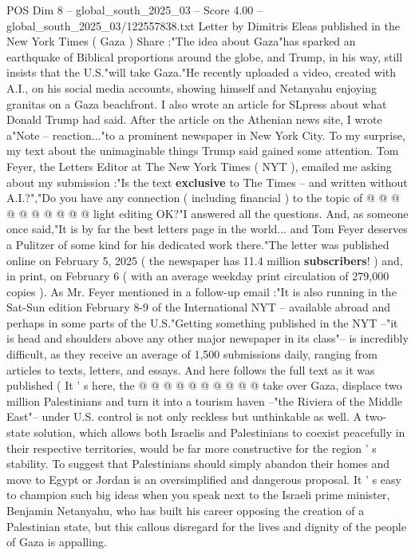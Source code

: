 \begin{textsample}{POS Dim 8 – global\_south\_2025\_03 – Score 4.00 – global\_south\_2025\_03/122557838.txt}  \label{ex:f8_pos_149}
Letter by Dimitris Eleas published in the New York Times ( Gaza ) Share :"The idea about Gaza"has sparked an earthquake of Biblical proportions around the globe, and Trump, in his way, still insists that the U.S."will take Gaza."He recently uploaded a video, created with A.I., on his social media accounts, showing himself and Netanyahu enjoying granitas on a Gaza beachfront.
I also wrote an article for SLpress about what Donald Trump had said.
After the article on the Athenian news site, I wrote a"Note -- reaction..."to a prominent newspaper in New York City.
To my surprise, my text about the unimaginable things Trump said gained some attention.
Tom Feyer, the Letters Editor at The New York Times ( NYT ), emailed me asking about my submission :"Is the text \textbf{exclusive} to The Times -- and written without A.I.?","Do you have any connection ( including financial ) to the topic of @ @ @ @ @ @ @ @ @ @ light editing OK?"I answered all the questions.
And, as someone once said,"It is by far the best letters page in the world... and Tom Feyer deserves a Pulitzer of some kind for his dedicated work there."The letter was published online on February 5, 2025 ( the newspaper has 11.4 million \textbf{subscribers}! ) and, in print, on February 6 ( with an average weekday print circulation of 279,000 copies ).
As Mr.
Feyer mentioned in a follow-up email :"It is also running in the Sat-Sun edition February 8-9 of the International NYT -- available abroad and perhaps in some parts of the U.S."Getting something published in the NYT --"it is head and shoulders above any other major newspaper in its class"-- is incredibly difficult, as they receive an average of 1,500 submissions daily, ranging from articles to texts, letters, and essays.
And here follows the full text as it was published ( It ' s here, the @ @ @ @ @ @ @ @ @ @ take over Gaza, displace two million Palestinians and turn it into a tourism haven --"the Riviera of the Middle East"-- under U.S. control is not only reckless but unthinkable as well.
A two-state solution, which allows both Israelis and Palestinians to coexist peacefully in their respective territories, would be far more constructive for the region ' s stability.
To suggest that Palestinians should simply abandon their homes and move to Egypt or Jordan is an oversimplified and dangerous proposal.
It ' s easy to champion such big ideas when you speak next to the Israeli prime minister, Benjamin Netanyahu, who has built his career opposing the creation of a Palestinian state, but this callous disregard for the lives and dignity of the people of Gaza is appalling.

\end{textsample}
